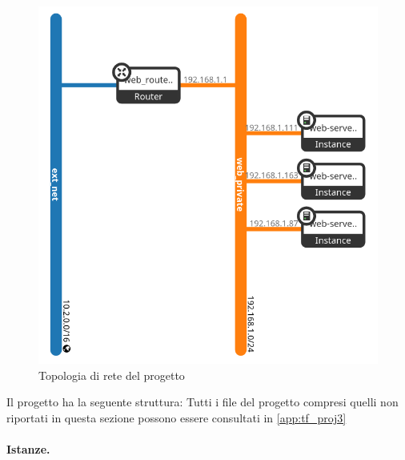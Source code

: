 \begin{figure}[H]
    \center
    \includegraphics[scale=0.5]{tesi/files/immagini/terraform/projects/project3_network_diagram.png}
    \caption{Topologia di rete del progetto}
    \label{fig:terraform_project3_network_topology}
\end{figure}

Il progetto ha la seguente struttura:
\noindent
Tutti i file del progetto compresi quelli non riportati in questa sezione possono essere consultati in \cref{app:tf_proj3}

\paragraph{Istanze.}

